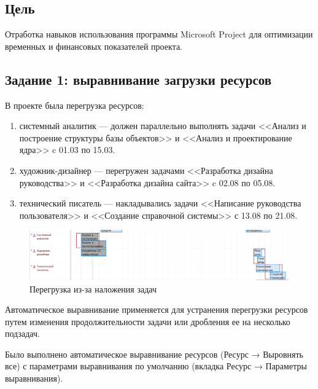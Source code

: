 \subsection*{Цель}

Отработка навыков использования программы Microsoft Project для оптимизации временных и финансовых показателей проекта.

\subsection*{Задание 1: выравнивание загрузки ресурсов}

В проекте была перегрузка ресурсов:

\begin{enumerate}
    \item системный аналитик --- должен параллельно выполнять задачи <<Анализ и построение структуры базы объектов>> и <<Анализ и проектирование ядра>> c 01.03 по 15.03.
    \item художник-дизайнер --- перегружен задачами <<Разработка дизайна руководства>> и <<Разработка дизайна сайта>> c 02.08 по 05.08.
    \item технический писатель --- накладывались задачи <<Написание руководства пользователя>> и <<Создание справочной системы>> с 13.08 по 21.08.
\end{enumerate}

\begin{figure}[h!]
	\begin{center}
		\includegraphics[scale=0.4]{inc/img/p_1.png}
	\end{center}
	\captionsetup{justification=centering}
	\caption{Перегрузка из-за наложения задач}
	\label{fig:u3}
\end{figure}

Автоматическое выравнивание применяется для устранения перегрузки ресурсов путем изменения продолжительности задачи или дробления ее на несколько подзадач.

Было выполнено автоматическое выравнивание ресурсов (Ресурс → Выровнять все) с параметрами выравнивания по умолчанию (вкладка Ресурс → Параметры выравнивания). 


